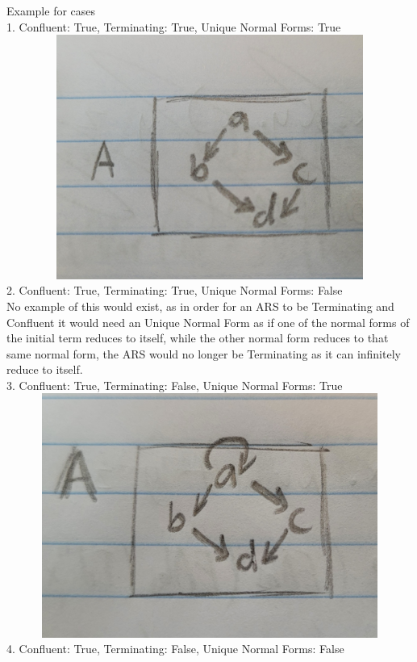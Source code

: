 \documentclass{article}
\theoremstyle{theorem}
\theoremstyle{definition}
\theoremstyle{remark}
\begin{document}
\\
\\Example for cases
\\ 1. Confluent: True, Terminating: True, Unique Normal Forms: True
\\ \includegraphics[width=15cm, height=8cm]{Report Images/week7_8.jpg}
\\ 2. Confluent: True, Terminating: True, Unique Normal Forms: False
\\  No example of this would exist, as in order for an ARS to be Terminating and Confluent it would need an Unique Normal Form as if one of the normal forms of the initial term reduces to itself, while the other normal form reduces to that same normal form, the ARS would no longer be Terminating as it can infinitely reduce to itself.
\\ 3. Confluent: True, Terminating: False, Unique Normal Forms: True
\\ \includegraphics[width=15cm, height=8cm]{Report Images/week7_9.jpg}
\\ 4. Confluent: True, Terminating: False, Unique Normal Forms: False
\end{document}
